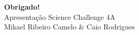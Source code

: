 \documentclass{beamer}
\begin{document}
\begin{frame}
    \begin{center}
        \Huge{\textbf{Obrigado!}}\\
        \vspace{0.4cm}
        \large{Apresentação Science Challenge 4A}\\ 
        \vspace{0.2cm}
        \normalsize{Mikael Ribeiro Camelo \& Caio Rodrigues} 
    \end{center}
\end{frame}
\end{document}
